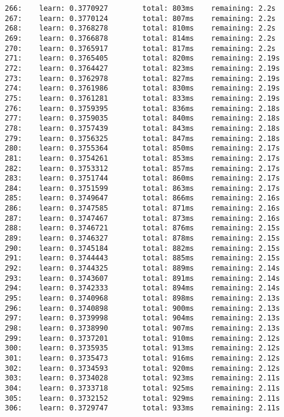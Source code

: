 \documentclass[11pt]{article}
\begin{document}
\begin{Verbatim}[commandchars=\\\{\}]
266:    learn: 0.3770927        total: 803ms    remaining: 2.2s
267:    learn: 0.3770124        total: 807ms    remaining: 2.2s
268:    learn: 0.3768278        total: 810ms    remaining: 2.2s
269:    learn: 0.3766878        total: 814ms    remaining: 2.2s
270:    learn: 0.3765917        total: 817ms    remaining: 2.2s
271:    learn: 0.3765405        total: 820ms    remaining: 2.19s
272:    learn: 0.3764427        total: 823ms    remaining: 2.19s
273:    learn: 0.3762978        total: 827ms    remaining: 2.19s
274:    learn: 0.3761986        total: 830ms    remaining: 2.19s
275:    learn: 0.3761281        total: 833ms    remaining: 2.19s
276:    learn: 0.3759395        total: 836ms    remaining: 2.18s
277:    learn: 0.3759035        total: 840ms    remaining: 2.18s
278:    learn: 0.3757439        total: 843ms    remaining: 2.18s
279:    learn: 0.3756325        total: 847ms    remaining: 2.18s
280:    learn: 0.3755364        total: 850ms    remaining: 2.17s
281:    learn: 0.3754261        total: 853ms    remaining: 2.17s
282:    learn: 0.3753312        total: 857ms    remaining: 2.17s
283:    learn: 0.3751744        total: 860ms    remaining: 2.17s
284:    learn: 0.3751599        total: 863ms    remaining: 2.17s
285:    learn: 0.3749647        total: 866ms    remaining: 2.16s
286:    learn: 0.3747585        total: 871ms    remaining: 2.16s
287:    learn: 0.3747467        total: 873ms    remaining: 2.16s
288:    learn: 0.3746721        total: 876ms    remaining: 2.15s
289:    learn: 0.3746327        total: 878ms    remaining: 2.15s
290:    learn: 0.3745184        total: 882ms    remaining: 2.15s
291:    learn: 0.3744443        total: 885ms    remaining: 2.15s
292:    learn: 0.3744325        total: 889ms    remaining: 2.14s
293:    learn: 0.3743607        total: 891ms    remaining: 2.14s
294:    learn: 0.3742333        total: 894ms    remaining: 2.14s
295:    learn: 0.3740968        total: 898ms    remaining: 2.13s
296:    learn: 0.3740898        total: 900ms    remaining: 2.13s
297:    learn: 0.3739998        total: 904ms    remaining: 2.13s
298:    learn: 0.3738990        total: 907ms    remaining: 2.13s
299:    learn: 0.3737201        total: 910ms    remaining: 2.12s
300:    learn: 0.3735935        total: 913ms    remaining: 2.12s
301:    learn: 0.3735473        total: 916ms    remaining: 2.12s
302:    learn: 0.3734593        total: 920ms    remaining: 2.12s
303:    learn: 0.3734028        total: 923ms    remaining: 2.11s
304:    learn: 0.3733718        total: 925ms    remaining: 2.11s
305:    learn: 0.3732152        total: 929ms    remaining: 2.11s
306:    learn: 0.3729747        total: 933ms    remaining: 2.11s

\end{Verbatim}
\end{document}
